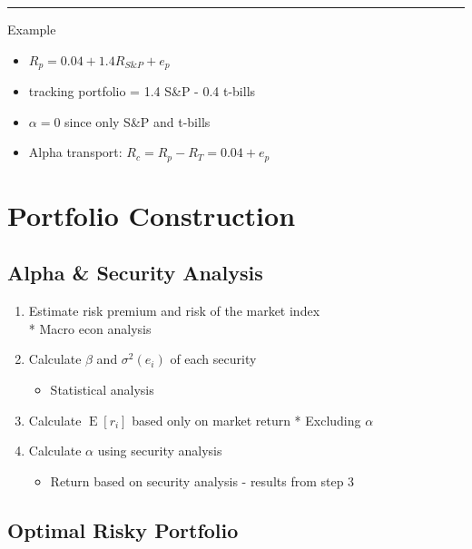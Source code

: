 \documentclass[]{book}
\providecommand{\tightlist}{%
  \setlength{\itemsep}{0pt}\setlength{\parskip}{0pt}}
\theoremstyle{definition}
\theoremstyle{definition}
\theoremstyle{remark}
\begin{document}
\begin{center}\rule{0.5\linewidth}{\linethickness}\end{center}

Example

\begin{itemize}
\item
  \(R_p = 0.04 + 1.4 R_{S\&P} + e_p\)
\item
  tracking portfolio = 1.4 S\&P - 0.4 t-bills
\item
  \(\alpha = 0\) since only S\&P and t-bills
\item
  Alpha transport: \(R_c = R_p - R_T = 0.04 + e_p\)
\end{itemize}

\section{Portfolio Construction}\label{portfolio-construction}

\subsection{Alpha \& Security Analysis}\label{alpha-security-analysis}

\begin{enumerate}
\def\labelenumi{\arabic{enumi})}
\tightlist
\item
  Estimate risk premium and risk of the market index\\
  * Macro econ analysis
\item
  Calculate \(\beta\) and \(\sigma^2(e_i)\) of each security

  \begin{itemize}
  \tightlist
  \item
    Statistical analysis
  \end{itemize}
\item
  Calculate \(\operatorname{E}[r_i]\) based only on market return *
  Excluding \(\alpha\)
\item
  Calculate \(\alpha\) using security analysis

  \begin{itemize}
  \tightlist
  \item
    Return based on security analysis - results from step 3
  \end{itemize}
\end{enumerate}

\subsection{Optimal Risky Portfolio}\label{optimal-risky-portfolio}
\end{document}
